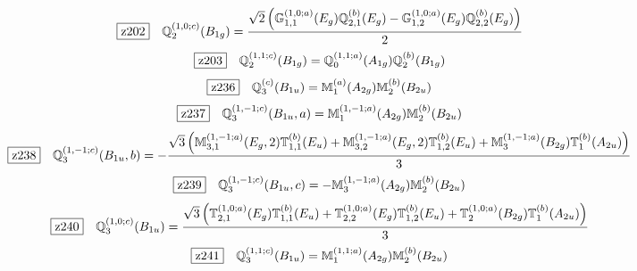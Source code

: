 \documentclass[fleqn,10pt,landscape]{jsarticle}
\begin{document}
\begin{dmath*}
\hspace*{3mm}\fbox{z202}\quad \mathbb{Q}_{2}^{(1,0;c)}(B_{1g})=\frac{\sqrt{2} \left(\mathbb{G}_{1,1}^{(1,0;a)}(E_{g}) \mathbb{Q}_{2,1}^{(b)}(E_{g}) - \mathbb{G}_{1,2}^{(1,0;a)}(E_{g}) \mathbb{Q}_{2,2}^{(b)}(E_{g})\right)}{2}
\end{dmath*}
\begin{dmath*}
\hspace*{3mm}\fbox{z203}\quad \mathbb{Q}_{2}^{(1,1;c)}(B_{1g})=\mathbb{Q}_{0}^{(1,1;a)}(A_{1g}) \mathbb{Q}_{2}^{(b)}(B_{1g})
\end{dmath*}
\begin{dmath*}
\hspace*{3mm}\fbox{z236}\quad \mathbb{Q}_{3}^{(c)}(B_{1u})=\mathbb{M}_{1}^{(a)}(A_{2g}) \mathbb{M}_{2}^{(b)}(B_{2u})
\end{dmath*}
\begin{dmath*}
\hspace*{3mm}\fbox{z237}\quad \mathbb{Q}_{3}^{(1,-1;c)}(B_{1u},a)=\mathbb{M}_{1}^{(1,-1;a)}(A_{2g}) \mathbb{M}_{2}^{(b)}(B_{2u})
\end{dmath*}
\begin{dmath*}
\hspace*{3mm}\fbox{z238}\quad \mathbb{Q}_{3}^{(1,-1;c)}(B_{1u},b)=- \frac{\sqrt{3} \left(\mathbb{M}_{3,1}^{(1,-1;a)}(E_{g},2) \mathbb{T}_{1,1}^{(b)}(E_{u}) + \mathbb{M}_{3,2}^{(1,-1;a)}(E_{g},2) \mathbb{T}_{1,2}^{(b)}(E_{u}) + \mathbb{M}_{3}^{(1,-1;a)}(B_{2g}) \mathbb{T}_{1}^{(b)}(A_{2u})\right)}{3}
\end{dmath*}
\begin{dmath*}
\hspace*{3mm}\fbox{z239}\quad \mathbb{Q}_{3}^{(1,-1;c)}(B_{1u},c)=- \mathbb{M}_{3}^{(1,-1;a)}(A_{2g}) \mathbb{M}_{2}^{(b)}(B_{2u})
\end{dmath*}
\begin{dmath*}
\hspace*{3mm}\fbox{z240}\quad \mathbb{Q}_{3}^{(1,0;c)}(B_{1u})=\frac{\sqrt{3} \left(\mathbb{T}_{2,1}^{(1,0;a)}(E_{g}) \mathbb{T}_{1,1}^{(b)}(E_{u}) + \mathbb{T}_{2,2}^{(1,0;a)}(E_{g}) \mathbb{T}_{1,2}^{(b)}(E_{u}) + \mathbb{T}_{2}^{(1,0;a)}(B_{2g}) \mathbb{T}_{1}^{(b)}(A_{2u})\right)}{3}
\end{dmath*}
\begin{dmath*}
\hspace*{3mm}\fbox{z241}\quad \mathbb{Q}_{3}^{(1,1;c)}(B_{1u})=\mathbb{M}_{1}^{(1,1;a)}(A_{2g}) \mathbb{M}_{2}^{(b)}(B_{2u})
\end{dmath*}
\end{document}
